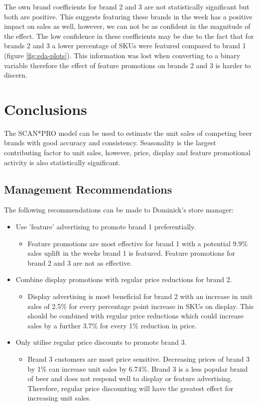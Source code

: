 \documentclass[a4paper,11pt]{article}
\begin{document}
The own brand coefficients for brand 2 and 3 are not statistically significant but both are positive. This suggests featuring these brands in the week has a positive impact on sales as well, however, we can not be as confident in the magnitude of the effect. The low confidence in these coefficients may be due to the fact that for brands 2 and 3 a lower percentage of SKUs were featured compared to brand 1 (figure \ref{fig:eda-plots}). This information was lost when converting to a binary variable therefore the effect of feature promotions on brands 2 and 3 is harder to discern.


\section{Conclusions}

The SCAN*PRO model can be used to estimate the unit sales of competing beer brands with good accuracy and consistency. Seasonality is the largest contributing factor to unit sales, however, price, display and feature promotional activity is also statistically significant. 

\subsection{Management Recommendations}
The following recommendations can be made to Dominick's store manager:
\begin{itemize}
    \item Use 'feature' advertising to promote brand 1 preferentially.
    \begin{itemize}
        \item Feature promotions are most effective for brand 1 with a potential 9.9\% sales uplift in the weeks brand 1 is featured. Feature promotions for brand 2 and 3 are not as effective.
    \end{itemize}
    \item Combine display promotions with regular price reductions for brand 2.
    \begin{itemize}
        \item Display advertising is most beneficial for brand 2 with an increase in unit sales of 2.5\% for every percentage point increase in SKUs on display. This should be combined with regular price reductions which could increase sales by a further 3.7\% for every 1\% reduction in price.
    \end{itemize}
    \item Only utilise regular price discounts to promote brand 3.
    \begin{itemize}
        \item Brand 3 customers are most price sensitive. Decreasing prices of brand 3 by 1\% can increase unit sales by 6.74\%. Brand 3 is a less popular brand of beer and does not respond well to display or feature advertising. Therefore, regular price discounting will have the greatest effect for increasing unit sales. 
    \end{itemize}
    

\end{itemize}
\end{document}
